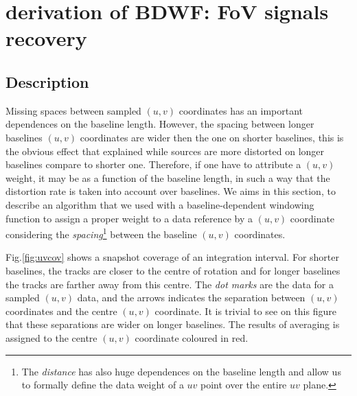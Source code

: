 \documentclass[useAMS,usenatbib]{mn2e}
\begin{document}
\section{derivation of BDWF: FoV signals recovery}
\label{baseline1}
\subsection{Description}
Missing spaces between sampled $(u,v)$ coordinates has an important dependences on the baseline length. However, the spacing between longer 
baselines $(u,v)$ coordinates are wider then the one on shorter baselines, this is the obvious effect that explained while sources are more 
distorted on longer baselines compare to shorter one. Therefore, if one have to attribute a $(u,v)$ weight, it may be as a function of 
the baseline length, in such a way that the distortion rate is taken into account over baselines. We aims in this section, to 
describe an algorithm that we used with a baseline-dependent windowing function to assign a proper weight to a data reference by a $(u,v)$ 
coordinate considering the \textit{spacing}\footnote{The \textit{distance} has also huge 
dependences on the baseline length and allow us to formally define the data
weight of a $uv$ point over the entire $uv$ plane.} between the baseline $(u,v)$ coordinates.

Fig.\ref{fig:uvcov} shows a snapshot coverage of an integration interval. For shorter baselines, the tracks are closer to the centre of 
rotation and for longer baselines the tracks are farther away from this centre. The \textit{dot marks} are the data for a sampled $(u,v)$ 
data, and the  arrows indicates the separation between $(u,v)$ coordinates and the centre $(u,v)$ coordinate. It is trivial to see on this 
figure that these separations are wider on longer baselines. The results of averaging is assigned to the centre $(u,v)$ coordinate coloured 
in red. 
\end{document}
